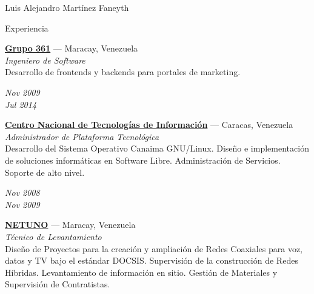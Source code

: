 \documentclass[10pt,letterpaper]{article}
\begin{document}
\begin{cv}{Luis Alejandro Mart\'inez Faneyth}
\begin{cvlist}{Experiencia}
{	\parbox[t]{\linewidth}{
		\textbf{\href{http://www.grupo361.com}{Grupo 361}} --- Maracay, Venezuela\\
		\textit{Ingeniero de Software}\\
		\footnotesize{Desarrollo de frontends y backends para portales de marketing.}
	}
}
\item[{\parbox[t]{6em}{\textit{\large{Nov 2009\\Jul 2014}}}}]{
	\parbox[t]{\linewidth}{
		\textbf{\href{https://www.cnti.gob.ve}{Centro Nacional de Tecnolog\'ias de Informaci\'on}} --- Caracas, Venezuela\\
		\textit{Administrador de Plataforma Tecnol\'ogica}\\
		\footnotesize{Desarrollo del Sistema Operativo Canaima GNU/Linux. Dise\~no e implementaci\'on de soluciones inform\'aticas en Software Libre. Administraci\'on de Servicios. Soporte de alto nivel.}
	}
}
\item[{\parbox[t]{6em}{\textit{\large{Nov 2008\\Nov 2009}}}}]{
	\parbox[t]{\linewidth}{
		\textbf{\href{https://www.netuno.net}{NETUNO}} --- Maracay, Venezuela\\
		\textit{T\'ecnico de Levantamiento}\\
		\footnotesize{Dise\~no de Proyectos para la creaci\'on y ampliaci\'on de Redes Coaxiales para voz, datos y TV bajo el est\'andar DOCSIS. Supervisi\'on de la construcci\'on de Redes H\'ibridas. Levantamiento de informaci\'on en sitio. Gesti\'on de Materiales y Supervisi\'on de Contratistas.}
	}
}
\end{cvlist}


\end{cv}
\end{document}

